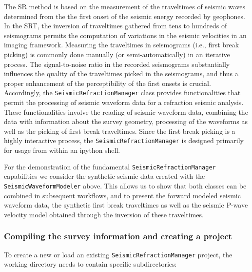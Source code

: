\documentclass[a4paper,fleqn]{cas-sc}
\begin{document}
The SR method is based on the measurement of the traveltimes of seismic waves determined from the the first onset of the seismic energy recorded by geophones. In the SRT, the inversion of traveltimes gathered from tens to hundreds of seismograms permits the computation of variations in the seismic velocities in an imaging framework. Measuring the traveltimes in seismograms (i.e., first break picking) is commonly done manually (or semi-automatically) in an iterative process. The signal-to-noise ratio in the recorded seismograms substantially influences the quality of the traveltimes picked in the seismograms, and thus a proper enhancement of the perceptibility of the first onsets is crucial.
Accordingly, the \texttt{SeismicRefractionManager} class provides functionalities that permit the processing of seismic waveform data for a refraction seismic analysis. These functionalities involve the reading of seismic waveform data, combining the data with information about the survey geometry, processing of the waveforms as well as the picking of first break traveltimes. Since the first break picking is a highly interactive process, the \texttt{SeismicRefractionManager} is designed primarily for usage from within an ipython shell.

For the demonstration of the fundamental \texttt{SeismicRefractionManager} capabilities we consider the synthetic seismic data created with the \texttt{SeismicWaveformModeler} above. This allows us to show that both classes can be combined in subsequent workflows, and to present the forward modeled seismic waveform data, the synthetic first break traveltimes as well as the seismic P-wave velocity model obtained through the inversion of these traveltimes. 

\subsubsection{Compiling the survey information and creating a project}

To create a new or load an existing \texttt{SeismicRefractionManager} project, the working directory needs to contain specific subdirectories:
\end{document}
